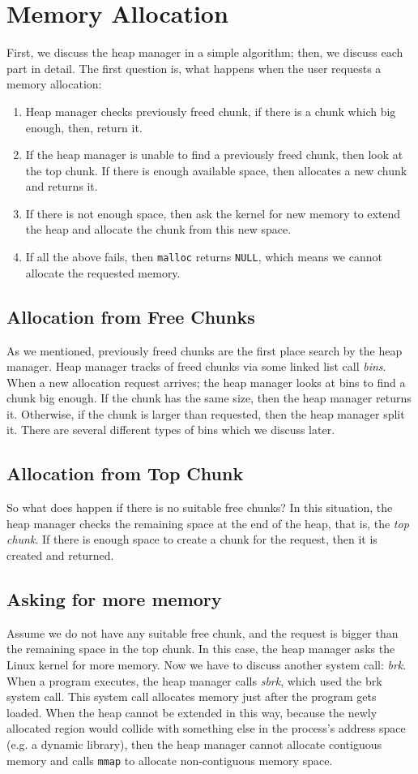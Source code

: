 \documentclass{masterthesis}
\newcommand*\mallocc{\lstinline{malloc}}
\newcommand*\mmapc{\lstinline{mmap}}
\begin{document}
\section{Memory Allocation}
 First, we discuss the heap manager in a simple algorithm; then, we discuss each part in detail. The first question is, what happens when the user requests a memory allocation:
\begin{enumerate}
	\item Heap manager checks previously freed chunk, if there is a chunk which big enough, then, return it.
	\item If the heap manager is unable to find a previously freed chunk, then look at the top chunk. If there is enough available space, then allocates a new chunk and returns it.
	\item If there is not enough space, then ask the kernel for new memory to extend the heap and allocate the chunk from this new space.
	\item If all the above fails, then \mallocc{} returns \lstinline{NULL}, which means we cannot allocate the requested memory.
\end{enumerate}

\subsection{Allocation from Free Chunks}
As we mentioned, previously freed chunks are the first place search by the heap manager. Heap manager tracks of freed chunks via some linked list call \emph{bins}. When a new allocation request arrives; the heap manager looks at bins to find a chunk big enough. If the chunk has the same size, then the heap manager returns it. Otherwise, if the chunk is larger than requested, then the heap manager split it. There are several different types of bins which we discuss later.

\subsection{Allocation from Top Chunk}
So what does happen if there is no suitable free chunks? In this situation, the heap manager checks the remaining space at the end of the heap, that is, the \emph{top chunk}. If there is enough space to create a chunk for the request, then it is created and returned.

\subsection{Asking for more memory}
Assume we do not have any suitable free chunk, and the request is bigger than the remaining space in the top chunk. In this case, the heap manager asks the Linux kernel for more memory. Now we have to discuss another system call: \emph{brk}. When a program executes, the heap manager calls \emph{sbrk}, which used the brk system call. This system call allocates memory just after the program gets loaded.
When the heap cannot be extended in this way, because the newly allocated region would collide with something else in the process's address space (e.g. a dynamic library), then the heap manager cannot allocate contiguous memory and calls \mmapc{} to allocate non-contiguous memory space.
\end{document}
